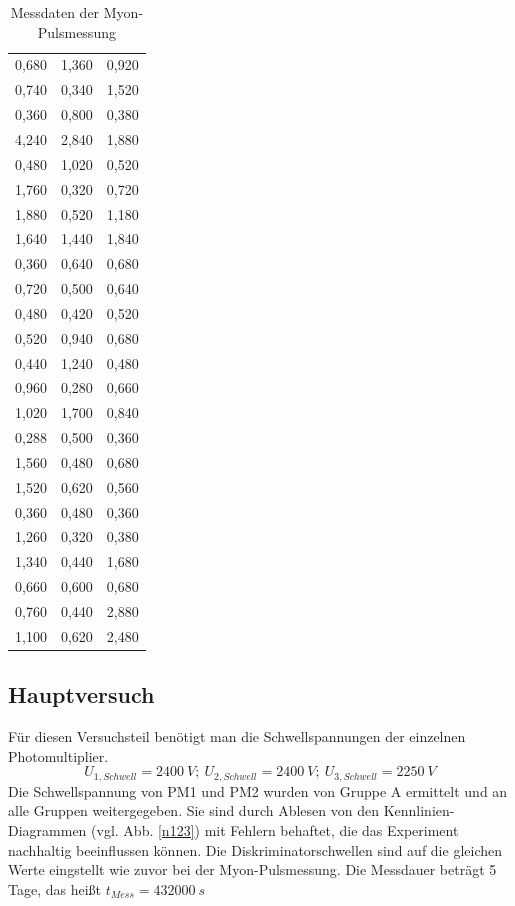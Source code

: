 \begin{table}[ht]
\begin{tabular}{c|c|c}
                        0,680 & 1,360 & 0,920\\
                        0,740 & 0,340 & 1,520\\
                        0,360 & 0,800 & 0,380\\
                        4,240 & 2,840 & 1,880\\
                        0,480 & 1,020 & 0,520\\
                        1,760 & 0,320 & 0,720\\
                        1,880 & 0,520 & 1,180\\
                        1,640 & 1,440 & 1,840\\
                        0,360 & 0,640 & 0,680\\
                        0,720 & 0,500 & 0,640\\
                        0,480 & 0,420 & 0,520\\
                        0,520 & 0,940 & 0,680\\
                        0,440 & 1,240 & 0,480\\
                        0,960 & 0,280 & 0,660\\
                        1,020 & 1,700 & 0,840\\
                        0,288 & 0,500 & 0,360\\
                        1,560 & 0,480 & 0,680\\
                        1,520 & 0,620 & 0,560\\
                        0,360 & 0,480 & 0,360\\
                        1,260 & 0,320 & 0,380\\
                        1,340 & 0,440 & 1,680\\
                        0,660 & 0,600 & 0,680\\
                        0,760 & 0,440 & 2,880\\
                        1,100 & 0,620 & 2,480\\
                    \end{tabular}
                    \caption{Messdaten der Myon-Pulsmessung}
                    \label{pulsen} 
                \end{table}
                
                \subsection{Hauptversuch}
                Für diesen Versuchsteil benötigt man die Schwellspannungen der einzelnen Photomultiplier. $$ U_{1,Schwell} = 2400\ \unit{V};\ U_{2,Schwell} = 2400\ \unit{V};\ U_{3,Schwell} = 2250\ \unit{V} $$
                Die Schwellspannung von PM1 und PM2 wurden von Gruppe A ermittelt und an alle Gruppen weitergegeben. Sie sind durch Ablesen von den Kennlinien-Diagrammen (vgl. Abb. \ref{n123}) mit Fehlern behaftet, die das Experiment nachhaltig beeinflussen können.
                Die Diskriminatorschwellen sind auf die gleichen Werte eingstellt wie zuvor bei der Myon-Pulsmessung.
                Die Messdauer beträgt 5 Tage, das heißt $t_{Mess} = 432000\ \unit{s}$